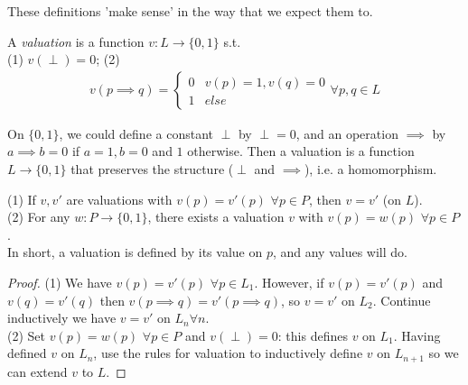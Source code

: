 \documentclass[a4paper]{article}
\begin{document}
These definitions 'make sense' in the way that we expect them to.

\begin{defi}
A \emph{valuation} is a function $v:L \to \{0,1\}$ s.t.\\
(1) $v(\perp) = 0$;
(2) 
\begin{equation*}
\begin{aligned}
v(p \implies q) = \left\{ \begin{array}{ll}
0 & v(p) =1, v(q) = 0\\
1 & else
\end{array}
\right. \forall p,q \in L
\end{aligned}
\end{equation*}
\end{defi}

\begin{rem}
On $\{0,1\}$, we could define a constant $\perp$ by $\perp = 0$, and an operation $\implies$ by $a \implies b = 0$ if $a=1, b=0$ and $1$ otherwise. Then a valuation is a function $L \to \{0,1\}$ that preserves the structure ($\perp$ and $\implies$), i.e. a homomorphism.
\end{rem}

\begin{prop}
(1) If $v,v'$ are valuations with $v(p) = v'(p)$ $\forall p \in P$, then $v=v'$ (on $L$).\\
(2) For any $w:P \to \{0,1\}$, there exists a valuation $v$ with $v(p) = w(p)$ $\forall p \in P$.\\
In short, a valuation is defined by its value on $p$, and any values will do.
\begin{proof}
(1) We have $v(p)=v'(p)$ $\forall p \in L_1$. However, if $v(p) = v'(p)$ and $v(q) = v'(q)$ then $v(p \implies q) = v'(p \implies q)$, so $v=v'$ on $L_2$. Continue inductively we have $v=v'$ on $L_n \forall n$.\\
(2) Set $v(p) = w(p)$ $\forall p \in P$ and $v(\perp) = 0$: this defines $v$ on $L_1$. Having defined $v$ on $L_n$, use the rules for valuation to inductively define $v$ on $L_{n+1}$ so we can extend $v$ to $L$.
\end{proof}
\end{prop}
\end{document}
